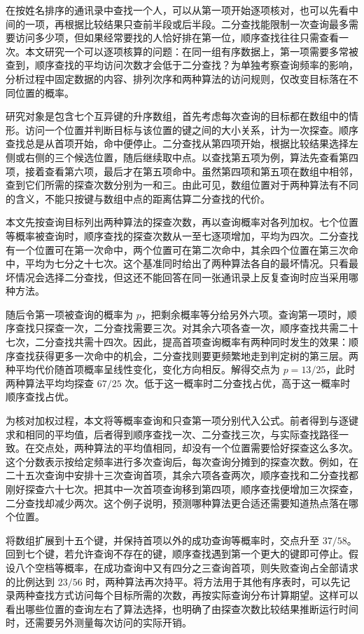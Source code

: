 \documentclass[lang=en]{fduthesis}
\begin{document}
\frontmatter
\makecoverpage
\makecommittee
\tableofcontents
\begin{fdusummary}
在按姓名排序的通讯录中查找一个人，可以从第一项开始逐项核对，也可以先看中间的一项，再根据比较结果只查前半段或后半段。二分查找能限制一次查询最多需要访问多少项，但如果经常要找的人恰好排在第一位，顺序查找往往只需查看一次。本文研究一个可以逐项核算的问题：在同一组有序数据上，第一项需要多常被查到，顺序查找的平均访问次数才会低于二分查找？为单独考察查询频率的影响，分析过程中固定数据的内容、排列次序和两种算法的访问规则，仅改变目标落在不同位置的概率。

研究对象是包含七个互异键的升序数组，首先考虑每次查询的目标都在数组中的情形。访问一个位置并判断目标与该位置的键之间的大小关系，计为一次探查。顺序查找总是从首项开始，命中便停止。二分查找从第四项开始，根据比较结果选择左侧或右侧的三个候选位置，随后继续取中点。以查找第五项为例，算法先查看第四项，接着查看第六项，最后才在第五项命中。虽然第四项和第五项在数组中相邻，查到它们所需的探查次数分别为一和三。由此可见，数组位置对于两种算法有不同的含义，不能只按键与数组中点的距离估算二分查找的代价。

本文先按查询目标列出两种算法的探查次数，再以查询概率对各列加权。七个位置等概率被查询时，顺序查找的探查次数从一至七逐项增加，平均为四次。二分查找有一个位置可在第一次命中，两个位置可在第二次命中，其余四个位置在第三次命中，平均为七分之十七次。这个基准同时给出了两种算法各自的最坏情况。只看最坏情况会选择二分查找，但这还不能回答在同一张通讯录上反复查询时应当采用哪种方法。

随后令第一项被查询的概率为 $p$，把剩余概率等分给另外六项。查询第一项时，顺序查找只探查一次，二分查找需要三次。对其余六项各查一次，顺序查找共需二十七次，二分查找共需十四次。因此，提高首项查询概率有两种同时发生的效果：顺序查找获得更多一次命中的机会，二分查找则要更频繁地走到判定树的第三层。两种平均代价随首项概率呈线性变化，变化方向相反。解得交点为 $p=13/25$，此时两种算法平均均探查 $67/25$ 次。低于这一概率时二分查找占优，高于这一概率时顺序查找占优。

为核对加权过程，本文将等概率查询和只查第一项分别代入公式。前者得到与逐键求和相同的平均值，后者得到顺序查找一次、二分查找三次，与实际查找路径一致。在交点处，两种算法的平均值相同，却没有一个位置需要恰好探查这么多次。这个分数表示按给定频率进行多次查询后，每次查询分摊到的探查次数。例如，在二十五次查询中安排十三次查询首项，其余六项各查两次，顺序查找和二分查找都刚好探查六十七次。把其中一次首项查询移到第四项，顺序查找便增加三次探查，二分查找却减少两次。这个例子说明，预测哪种算法更合适还需要知道热点落在哪个位置。

将数组扩展到十五个键，并保持首项以外的成功查询等概率时，交点升至 $37/58$。回到七个键，若允许查询不存在的键，顺序查找遇到第一个更大的键即可停止。假设八个空档等概率，在成功查询中又有四分之三查询首项，则失败查询占全部请求的比例达到 $23/56$ 时，两种算法再次持平。将方法用于其他有序表时，可以先记录两种查找方式访问每个目标所需的次数，再按实际查询分布计算期望。这样可以看出哪些位置的查询左右了算法选择，也明确了由探查次数比较结果推断运行时间时，还需要另外测量每次访问的实际开销。
\end{fdusummary}
\end{document}
